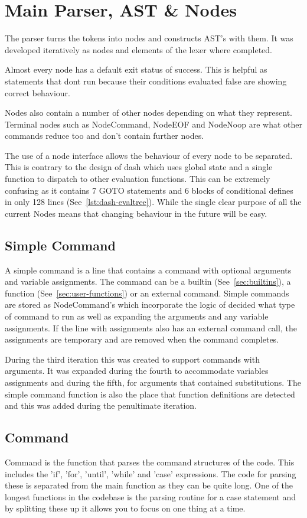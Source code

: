 \section{Main Parser, AST \& Nodes}
The parser turns the tokens into nodes and constructs AST's with them.
It was developed iteratively as nodes and elements of the lexer where completed. 

Almost every node has a default exit status of success.
This is helpful as statements that dont run because their conditions evaluated false are showing correct behaviour.

Nodes also contain a number of other nodes depending on what they represent.
Terminal nodes such as NodeCommand, NodeEOF and NodeNoop are what other commands reduce too and don't contain further nodes.

The use of a node interface allows the behaviour of every node to be separated.
This is contrary to the design of dash which uses global state and a single function to dispatch to other evaluation functions.
This can be extremely confusing as it contains 7 GOTO statements and 6 blocks of conditional defines in only 128 lines (See~\ref{lst:dash-evaltree}).
While the single clear purpose of all the current Nodes means that changing behaviour in the future will be easy.


\subsection{Simple Command}
A simple command is a line that contains a command with optional arguments and variable assignments.
The command can be a builtin (See~\ref{sec:builtins}), a function (See~\ref{sec:user-functions}) or an external command.
Simple commands are stored as NodeCommand's which incorporate the logic of decided what type of command to run as well as expanding the arguments and any variable assignments.
If the line with assignments also has an external command call, the assignments are temporary and are removed when the command completes.

During the third iteration this was created to support commands with arguments.
It was expanded during the fourth to accommodate variables assignments and during the fifth, for arguments that contained substitutions.
The simple command function is also the place that function definitions are detected and this was added during the penultimate iteration.

\subsection{Command}
Command is the function that parses the command structures of the code.
This includes the 'if', 'for', 'until', 'while' and 'case' expressions.
The code for parsing these is separated from the main function as they can be quite long.
One of the longest functions in the codebase is the parsing routine for a case statement and by splitting these up it allows you to focus on one thing at a time.


